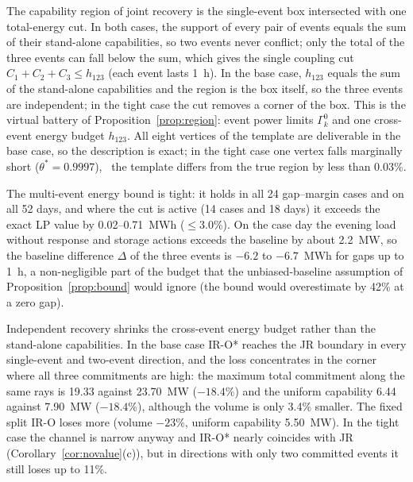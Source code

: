 The capability region of joint recovery is the single-event box intersected with one total-energy cut. In both cases,
the support of every pair of events equals the sum of their stand-alone capabilities, so two events never conflict;
only the total of the three events can fall below the sum, which gives the single coupling cut $C_1+C_2+C_3\le h_{123}$
(each event lasts 1~h). In the base case, $h_{123}$ equals the sum of the stand-alone capabilities and the region is the
box itself, so the three events are independent; in the tight case the cut removes a corner of the box. This is the
virtual battery of Proposition~\ref{prop:region}: event power limits $\Gamma^0_k$ and one cross-event energy budget
$h_{123}$. All eight vertices of the template are deliverable in the base case, so the description is exact; in the
tight case one vertex falls marginally short ($\theta^*=0.9997$), \ie\ the template differs from the true region by
less than 0.03\%.

The multi-event energy bound is tight: it holds in all 24 gap--margin cases and on all 52 days, and where the cut is
active (14 cases and 18 days) it exceeds the exact LP value by 0.02--0.71~MWh ($\le$3.0\%). On the case day the evening load
without response and storage actions exceeds the baseline by about 2.2~MW, so the baseline difference $\Delta$ of the three events
is $-6.2$ to $-6.7$~MWh for gaps up to 1~h, a non-negligible part of the budget that the unbiased-baseline assumption
of Proposition~\ref{prop:bound} would ignore (the bound would overestimate by 42\% at a zero gap).

Independent recovery shrinks the cross-event energy budget rather than the stand-alone capabilities. In the base case
IR-O* reaches the JR boundary in every single-event and two-event direction, and the loss concentrates in the corner
where all three commitments are high: the maximum total commitment along the same rays is 19.33 against 23.70~MW
($-18.4\%$) and the uniform capability 6.44 against 7.90~MW ($-18.4\%$), although the volume is only 3.4\% smaller. The
fixed split IR-O loses more (volume $-23\%$, uniform capability 5.50~MW). In the tight case the channel is narrow
anyway and IR-O* nearly coincides with JR (Corollary~\ref{cor:novalue}(c)), but in directions with only two committed
events it still loses up to 11\%.

